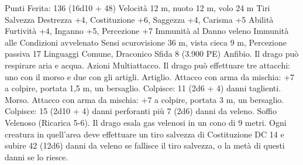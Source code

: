 \begin{multicols}{2}
\hspace*{0pt}\hfill{Punti Ferita}: 136 (16d10 + 48)
Velocità 12 m, nuoto 12 m, volo 24 m
Tiri Salvezza Destrezza +4, Costituzione +6, Saggezza +4, Carisma +5
Abilità Furtività +4, Inganno +5, Percezione +7
Immunità al Danno veleno
Immunità alle Condizioni avvelenato
Sensi scurovisione 36 m, vista cieca 9 m, Percezione passiva 17
Linguaggi Comune, Draconico
Sfida 8 (3.900 PE)
Anfibio. Il drago può respirare aria e acqua.
Azioni
Multiattacco. Il drago può effettuare tre attacchi: uno con il
morso e due con gli artigli.
Artiglio. Attacco con arma da mischia: +7 a colpire, portata 1,5
m, un bersaglio.
Colpisce: 11 (2d6 + 4) danni taglienti.
Morso. Attacco con arma da mischia: +7 a colpire, portata 3 m,
un bersaglio.
Colpisce: 15 (2d10 + 4) danni perforanti più 7 (2d6) danni da veleno.
Soffio Velenoso (Ricarica 5-6). Il drago esala gas velenosi in un
cono di 9 metri. Ogni creatura in quell’area deve effettuare un tiro
salvezza di Costituzione DC 14 e subire 42 (12d6) danni da veleno se
fallisce il tiro salvezza, o la metà di questi danni se lo riesce.
 

\end{multicols}
